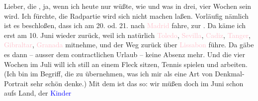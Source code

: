 \pstart
           Lieber, die \label{K_L03422-1v}\label{K_L03422-1h}, ja, wenn ich heute nur wüßte, wie und was in drei, vier Wochen sein wird.
               Ich fürchte, die Radpartie wird sich nicht machen laßen. Vorläufig nämlich ist es
               beschloßen, dass ich am 20. od. 21. nach \textcolor{pink}{Madrid}{}\ledrightnote{\textcolor{pink}{Madrid}}
               fahre, zur \label{K_L03422-2v}\label{K_L03422-2h}. Da
               käme ich erst am 10. Juni wieder zurück, weil ich
               natürlich \textcolor{pink}{Toledo}{}\ledrightnote{\textcolor{pink}{Toledo}}, \textcolor{pink}{Sevilla}{}\ledrightnote{\textcolor{pink}{Sevilla}}, \textcolor{pink}{Cadiz}{}\ledrightnote{\textcolor{pink}{Cadiz}}, \textcolor{pink}{Tanger}{}\ledrightnote{\textcolor{pink}{Tanger}}, \textcolor{pink}{Gibraltar}{}\ledrightnote{\textcolor{pink}{Gibraltar}}, \textcolor{pink}{Granada}{}\ledrightnote{\textcolor{pink}{Granada}} mitnehme, und der
               Weg zurück über \textcolor{pink}{Lissabon}{}\ledrightnote{\textcolor{pink}{Lissabon}} führe. Da gäbe es dann
               – ausser dem contractlichen Urlaub – keine Absenz mehr. Und die vier Wochen im Juli will ich still an einem Fleck sitzen, Tennis spielen
               und arbeiten. (Ich bin im Begriff, die \label{K_L03422-3v}\label{K_L03422-3h} zu
               übernehmen, was ich mir als eine Art von Denkmal-Portrait sehr schön denke.) Mit dem
                  \label{K_L03422-4v}\label{K_L03422-4h} ist das so: wir müßen doch im Juni schon aufs
               Land, der \textcolor{blue}{Kinder}{}\ledrightnote{{$\rightarrow$}\textcolor{blue}{Anna Katharina Rehmann}{\newline}{$\rightarrow$}\textcolor{blue}{Paul Salten}}
